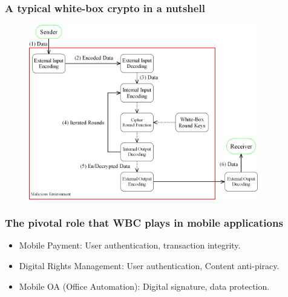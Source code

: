 \documentclass[aspectratio=169,xcolor=dvipsnames]{beamer}
\begin{document}
\frame
{
\frametitle{A typical white-box crypto in a nutshell}
\begin{figure}[htbp]
\centering
  \includegraphics[width=10cm]{./pics/WBCrypto_Functional_Model.png}

\end{figure}

}

\frame
{
\frametitle{The pivotal role that WBC plays in mobile applications}
\begin{itemize}
\setlength{\itemsep}{12pt}
\item Mobile Payment: User authentication, transaction integrity.

\item Digital Rights Management: User authentication, Content anti-piracy.

\item Mobile OA (Office Automation): Digital signature, data protection.
\end{itemize}

}
\end{document}
